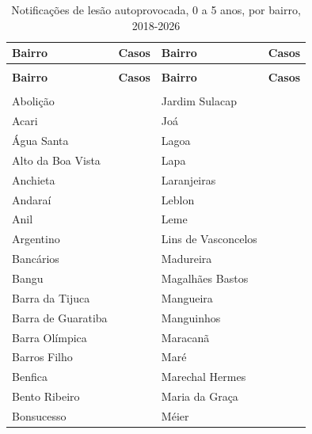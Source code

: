\begin{apendicesenv}
{\renewcommand{\arraystretch}{1.0}
{\footnotesize\setlength{\tabcolsep}{3.5pt}
\begin{longtable}{@{}>{\raggedright\arraybackslash}p{2.95cm}>{\raggedleft\arraybackslash}p{4.25cm}@{\hspace{0.6cm}}>{\raggedright\arraybackslash}p{2.95cm}>{\raggedleft\arraybackslash}p{4.25cm}@{}}
\caption{Notificações de lesão autoprovocada, 0 a 5 anos, por bairro, 2018-2026}\label{tab:tabela-mapa-notif-autoprovocada-2026}\\
\toprule \hyphenpenalty=10000\exhyphenpenalty=10000\textbf{Bairro} & \hyphenpenalty=10000\exhyphenpenalty=10000\textbf{Casos} & \hyphenpenalty=10000\exhyphenpenalty=10000\textbf{Bairro} & \hyphenpenalty=10000\exhyphenpenalty=10000\textbf{Casos} \\ \midrule \endfirsthead
\multicolumn{4}{@{}l}{\footnotesize\itshape (continuação)}\\ \toprule \hyphenpenalty=10000\exhyphenpenalty=10000\textbf{Bairro} & \hyphenpenalty=10000\exhyphenpenalty=10000\textbf{Casos} & \hyphenpenalty=10000\exhyphenpenalty=10000\textbf{Bairro} & \hyphenpenalty=10000\exhyphenpenalty=10000\textbf{Casos} \\ \midrule \endhead
\midrule \multicolumn{4}{r@{}}{\footnotesize\itshape (continua)}\\ \endfoot
\bottomrule \endlastfoot
Abolição & 0 & Jardim Sulacap & 0 \\
Acari & 0 & Joá & 0 \\
Água Santa & 0 & Lagoa & 0 \\
Alto da Boa Vista & 0 & Lapa & 0 \\
Anchieta & 0 & Laranjeiras & 0 \\
Andaraí & 0 & Leblon & 0 \\
Anil & 0 & Leme & 0 \\
Argentino & 0 & Lins de Vasconcelos & 0 \\
Bancários & 0 & Madureira & 0 \\
Bangu & 0 & Magalhães Bastos & 0 \\
Barra da Tijuca & 0 & Mangueira & 1 \\
Barra de Guaratiba & 0 & Manguinhos & 0 \\
Barra Olímpica & 0 & Maracanã & 0 \\
Barros Filho & 0 & Maré & 0 \\
Benfica & 0 & Marechal Hermes & 0 \\
Bento Ribeiro & 0 & Maria da Graça & 0 \\
Bonsucesso & 0 & Méier & 1 \\

\end{longtable}}}
\end{apendicesenv}
